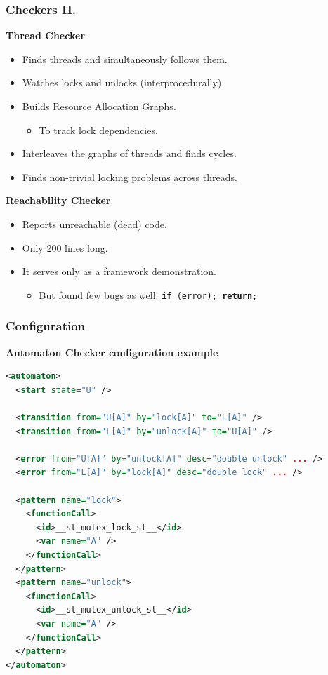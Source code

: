 \documentclass[handout,xcolor=dvipsnames]{beamer}
\newcommand{\heading}[1]{\textbf{\textcolor{BurntOrange}{#1}}}
\begin{document}
\begin{frame}
  \frametitle{Checkers II.}
  \heading{Thread Checker}
  \begin{itemize}
  \item Finds threads and simultaneously follows them.
  \item Watches locks and unlocks (interprocedurally).
  \item Builds Resource Allocation Graphs.
    \begin{itemize}
    \item To track lock dependencies.
    \end{itemize}
  \item Interleaves the graphs of threads and finds cycles.
  \item Finds non-trivial locking problems across threads.
  \end{itemize}

  \pause
  \bigskip
  \heading{Reachability Checker}
  \begin{itemize}
  \item Reports unreachable (dead) code.
  \item Only 200 lines long.
  \item It serves only as a framework demonstration.
    \begin{itemize}
    \item But found few bugs as well: \texttt{\textbf{if} (error)\underline{;}
      \textbf{return};}
    \end{itemize}
  \end{itemize}

\end{frame}

\begin{frame}[fragile]
  \frametitle{Configuration}
  \heading{Automaton Checker configuration example}
  \begin{lstlisting}[language=XML]
<automaton>
  <start state="U" />

  <transition from="U[A]" by="lock[A]" to="L[A]" />
  <transition from="L[A]" by="unlock[A]" to="U[A]" />

  <error from="U[A]" by="unlock[A]" desc="double unlock" ... />
  <error from="L[A]" by="lock[A]" desc="double lock" ... />

  <pattern name="lock">
    <functionCall>
      <id>__st_mutex_lock_st__</id>
      <var name="A" />
    </functionCall>
  </pattern>
  <pattern name="unlock">
    <functionCall>
      <id>__st_mutex_unlock_st__</id>
      <var name="A" />
    </functionCall>
  </pattern>
</automaton>
  \end{lstlisting}
\end{frame}
\end{document}
